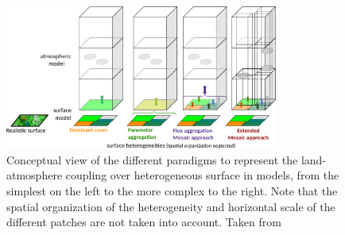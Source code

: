 \begin{figure}[ht]
    \centering
    \includegraphics[width=0.8\textwidth]{images/mosaic_approach.jpg}
    \caption{ Conceptual view of the different paradigms to represent the land-atmosphere coupling over heterogeneous surface in models, from the simplest on the left to the more complex to the right. Note that the spatial organization of the heterogeneity and horizontal scale of the different patches are not taken into account. Taken from \citet{lohou_model_2025}}
    \label{fig:mosaic_approach}
\end{figure}

